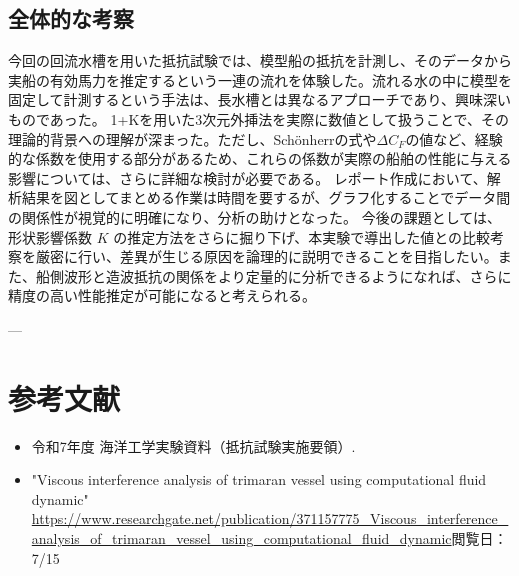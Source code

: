 \documentclass[dvipdfmx,a4paper]{jreport} %
\begin{document}
\section{全体的な考察}
今回の回流水槽を用いた抵抗試験では、模型船の抵抗を計測し、そのデータから実船の有効馬力を推定するという一連の流れを体験した。流れる水の中に模型を固定して計測するという手法は、長水槽とは異なるアプローチであり、興味深いものであった。
1+Kを用いた3次元外挿法を実際に数値として扱うことで、その理論的背景への理解が深まった。ただし、Schönherrの式や$\Delta C_F$の値など、経験的な係数を使用する部分があるため、これらの係数が実際の船舶の性能に与える影響については、さらに詳細な検討が必要である。
レポート作成において、解析結果を図としてまとめる作業は時間を要するが、グラフ化することでデータ間の関係性が視覚的に明確になり、分析の助けとなった。
今後の課題としては、形状影響係数 $K$ の推定方法をさらに掘り下げ、本実験で導出した値との比較考察を厳密に行い、差異が生じる原因を論理的に説明できることを目指したい。また、船側波形と造波抵抗の関係をより定量的に分析できるようになれば、さらに精度の高い性能推定が可能になると考えられる。

---

\chapter{参考文献}
\begin{itemize}
    \item 令和7年度 海洋工学実験資料（抵抗試験実施要領）.
    \item "Viscous interference analysis of trimaran vessel using computational fluid dynamic"
\url{https://www.researchgate.net/publication/371157775_Viscous_interference_analysis_of_trimaran_vessel_using_computational_fluid_dynamic}閲覧日：7/15
\end{itemize}
\end{document}

